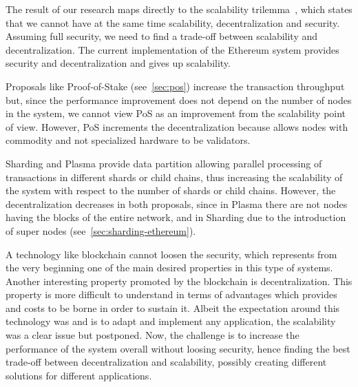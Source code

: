 The result of our research maps directly to the scalability
trilemma~\cite{bib:sharding-faq}, which states that we cannot have at the same
time scalability, decentralization and security. Assuming full security, we need
to find a trade-off between scalability and decentralization. The current
implementation of the Ethereum system provides security and decentralization and
gives up scalability.

Proposals like Proof-of-Stake (see~\autoref{sec:pos}) increase the transaction
throughput but, since the performance improvement does not depend on the number
of nodes in the system, we cannot view PoS as an improvement from the
scalability point of view. However, PoS increments the decentralization because
allows nodes with commodity and not specialized hardware to be validators.

Sharding and Plasma provide data partition allowing parallel processing of
transactions in different shards or child chains, thus increasing the
scalability of the system with respect to the number of shards or child chains.
However, the decentralization decreases in both proposals, since in Plasma there
are not nodes having the blocks of the entire network, and in Sharding due to
the introduction of super nodes (see~\autoref{sec:sharding-ethereum}).

A technology like blockchain cannot loosen the security, which represents from
the very beginning one of the main desired properties in this type of systems.
Another interesting property promoted by the blockchain is decentralization.
This property is more difficult to understand in terms of advantages which
provides and costs to be borne in order to sustain it. Albeit the expectation
around this technology was and is to adapt and implement any application, the
scalability was a clear issue but postponed. Now, the challenge is to increase
the performance of the system overall without loosing security, hence finding
the best trade-off between decentralization and scalability, possibly creating
different solutions for different applications.
